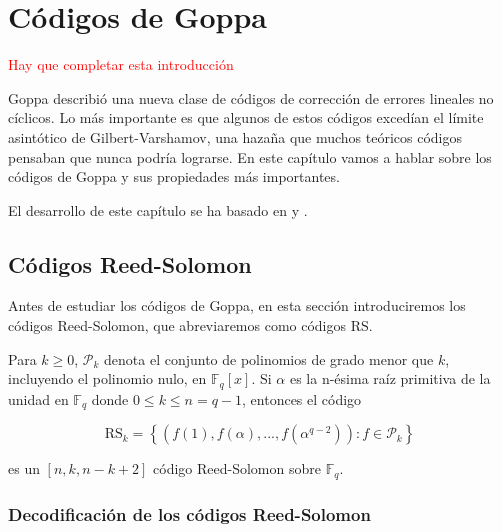 
\chapter{Códigos de Goppa}

\textcolor{red}{Hay que completar esta introducción}

Goppa describió una nueva clase de códigos de corrección de errores lineales no cíclicos. Lo más importante es que algunos de estos códigos excedían el límite asintótico de Gilbert-Varshamov, una hazaña que muchos teóricos códigos pensaban que nunca podría lograrse. En este capítulo vamos a hablar sobre los códigos de Goppa y sus propiedades más importantes.

El desarrollo de este capítulo se ha basado en \cite{Huffman_Pless_2010} y \cite{Goppa_codes_1973}.

\section{Códigos Reed-Solomon}

Antes de estudiar los códigos de Goppa, en esta sección introduciremos los códigos Reed-Solomon, que abreviaremos como códigos RS.

\begin{definition}
    Para $k \geq 0$, $\mathcal{P}_k$ denota el conjunto de polinomios de grado menor que $k$, incluyendo el polinomio nulo, en $\mathbb{F}_q[x]$. Si $\alpha$ es la n-ésima raíz primitiva de la unidad en $\mathbb{F}_q$ donde $0 \leq k \leq n = q - 1$, entonces el código

    $$\text{RS}_k = \left\{ \left( f(1), f(\alpha), ..., f(\alpha^{q-2}) \right) : f \in \mathcal{P}_k \right\}$$

    es un $[n, k, n - k + 2]$ código Reed-Solomon sobre $\mathbb{F}_q$.
\end{definition}

\subsection{Decodificación de los códigos Reed-Solomon}


